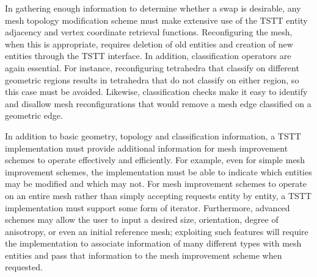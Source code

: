 In gathering enough information to determine whether a swap is
desirable, any mesh topology modification scheme must make extensive use
of the TSTT entity adjacency and vertex coordinate retrieval functions.
Reconfiguring the mesh, when this is appropriate, requires deletion of
old entities and creation of new entities through the TSTT interface.
In addition, classification operators are again essential.  For
instance, reconfiguring tetrahedra that classify on different geometric
regions results in tetrahedra that do not classify on either region, so
this case must be avoided.  Likewise, classification checks make it easy
to identify and disallow mesh reconfigurations that would remove a mesh
edge classified on a geometric edge.

In addition to basic geometry, topology and classification information,
a TSTT implementation must provide additional information for mesh
improvement schemes to operate effectively and efficiently.  For
example, even for simple mesh improvement schemes, the implementation
must be able to indicate which entities may be modified and which may
not.  For mesh improvement schemes to operate on an entire mesh rather
than simply accepting requests entity by entity, a TSTT implementation
must support some form of iterator.  Furthermore, advanced schemes may
allow the user to input a desired size, orientation, degree of
anisotropy, or even an initial reference mesh; exploiting such features
will require the implementation to associate information of many
different types with mesh entities and pass that information to the mesh
improvement scheme when requested.
